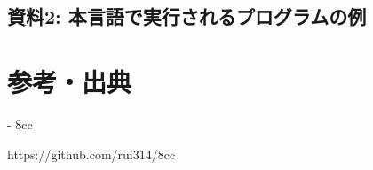 \documentclass[11pt,a4j]{jarticle}
\begin{document}
\subsection{資料2: 本言語で実行されるプログラムの例}






\section{参考・出典}

- 8cc

https://github.com/rui314/8cc
\end{document}
